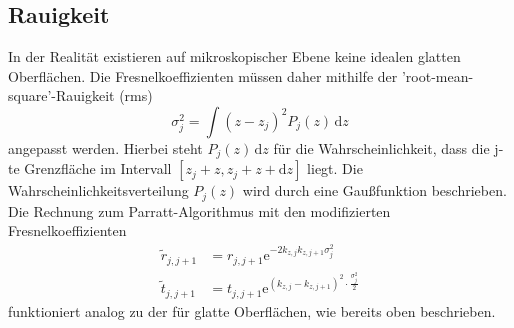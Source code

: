 \subsection{Rauigkeit}
In der Realität existieren auf mikroskopischer Ebene keine idealen glatten Oberflächen.
Die Fresnelkoeffizienten müssen daher mithilfe der 'root-mean-square'-Rauigkeit (rms)
\begin{equation}
    \sigma_j^2 = \int \left ( z - z_j \right )^2 P_j(z) \, \mathrm{d}z
    \label{eqn:rms}
\end{equation}
angepasst werden.
Hierbei steht $P_j(z) \, \mathrm{d}z$ für die Wahrscheinlichkeit, dass die j-te Grenzfläche im Intervall $[z_j + z, z_j + z + \mathrm{d}z]$ liegt.
Die Wahrscheinlichkeitsverteilung $P_j(z)$ wird durch eine Gaußfunktion beschrieben.
Die Rechnung zum Parratt-Algorithmus mit den modifizierten Fresnelkoeffizienten
\begin{align}
    \tilde{r}_{j,j+1} &= {r}_{j,j+1} \mathrm{e}^{-2 k_{z,j} k_{z,j+1} \sigma_j^2} \label{eqn:mod_fresnel_r} \\
    \tilde{t}_{j,j+1} &= {t}_{j,j+1} \mathrm{e}^{(k_{z,j} - k_{z,j+1})^2 \cdot \frac{\sigma_j^2}{2}} \label{eqn:mod_fresnel_t}
\end{align}
funktioniert analog zu der für glatte Oberflächen, wie bereits oben beschrieben.
\FloatBarrier

